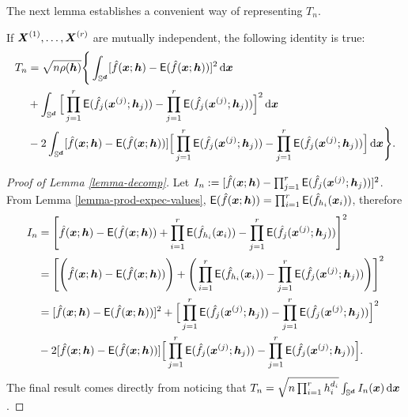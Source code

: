 \documentclass[oneside,11pt]{article}
\begin{document}
The next lemma establishes a convenient way of representing $T_n$.
\begin{lemma}\label{lemma-decomp}
    If $\boldsymbol{X}^{(1)}, \dots, \boldsymbol{X}^{(r)}$ are mutually independent, the following identity is true:
    \begin{align*}
       T_n &= \sqrt{n \rho({\boldsymbol{h}})} \Bigg\{ \int_{\mathbb{S}^{\boldsymbol{d}}} [\hat{f}(\boldsymbol{x};{\boldsymbol{h}}) - \mathsf{E} (\hat{f}(\boldsymbol{x};{\boldsymbol{h}}))]^2 \,\mathrm{d} \boldsymbol{x} \\
    &+ \int_{\mathbb{S}^{\boldsymbol{d}}} \Big[ \prod_{j = 1}^{r} \mathsf{E} (\hat{f}_{j} (\boldsymbol{x}^{(j)};{\boldsymbol{h}}_j)) - \prod_{j = 1}^{r} \mathsf{E} (\hat{f}_{j} (\boldsymbol{x}^{(j)};{\boldsymbol{h}}_j)) \Big]^2 \,\mathrm{d} \boldsymbol{x} \\
    &-2 \int_{\mathbb{S}^{\boldsymbol{d}}} [\hat{f}(\boldsymbol{x};{\boldsymbol{h}}) - \mathsf{E} (\hat{f}(\boldsymbol{x};{\boldsymbol{h}}))] \Big[ \prod_{j = 1}^{r} \mathsf{E} (\hat{f}_{j} (\boldsymbol{x}^{(j)};{\boldsymbol{h}}_j)) - \prod_{j = 1}^{r} \mathsf{E} (\hat{f}_{j} (\boldsymbol{x}^{(j)};{\boldsymbol{h}}_j)) \Big] \,\mathrm{d} \boldsymbol{x} \Bigg\}.
    \end{align*}
\end{lemma}
\begin{proof}[Proof of Lemma \ref{lemma-decomp}]
    Let $I_n := [\hat{f}(\boldsymbol{x};{\boldsymbol{h}}) - \prod_{j = 1}^{r} \mathsf{E} (\hat{f}_{j} (\boldsymbol{x}^{(j)};{\boldsymbol{h}}_j))]^2$. From Lemma \ref{lemma-prod-expec-values}, $\mathsf{E} (\hat{f}(\boldsymbol{x};{\boldsymbol{h}})) = \prod_{i = 1}^{r} \mathsf{E} (\hat{f}_{h_i}(\boldsymbol{x}_i))$, therefore
    \begin{align*}
        I_n &= \Bigg[\hat{f}(\boldsymbol{x};{\boldsymbol{h}}) - \mathsf{E} (\hat{f}(\boldsymbol{x};{\boldsymbol{h}})) + \prod_{i = 1}^{r} \mathsf{E} (\hat{f}_{h_i}(\boldsymbol{x}_i)) - \prod_{j = 1}^{r} \mathsf{E} (\hat{f}_{j} (\boldsymbol{x}^{(j)};{\boldsymbol{h}}_j)) \Bigg]^2 \\
        &= \Bigg[ \Bigg( \hat{f}(\boldsymbol{x};{\boldsymbol{h}}) - \mathsf{E} (\hat{f}(\boldsymbol{x};{\boldsymbol{h}})) \Bigg) + \Bigg( \prod_{i = 1}^{r} \mathsf{E} (\hat{f}_{h_i}(\boldsymbol{x}_i)) - \prod_{j = 1}^{r} \mathsf{E} (\hat{f}_{j} (\boldsymbol{x}^{(j)};{\boldsymbol{h}}_j)) \Bigg) \Bigg]^2 \\
        &= [\hat{f}(\boldsymbol{x};{\boldsymbol{h}}) - \mathsf{E} (\hat{f}(\boldsymbol{x};{\boldsymbol{h}}))]^2 + \Big[ \prod_{j = 1}^{r} \mathsf{E} (\hat{f}_{j} (\boldsymbol{x}^{(j)};{\boldsymbol{h}}_j)) - \prod_{j = 1}^{r} \mathsf{E} (\hat{f}_{j} (\boldsymbol{x}^{(j)};{\boldsymbol{h}}_j)) \Big]^2 \\
        &- 2[\hat{f}(\boldsymbol{x};{\boldsymbol{h}}) - \mathsf{E} (\hat{f}(\boldsymbol{x};{\boldsymbol{h}}))] \Big[ \prod_{j = 1}^{r} \mathsf{E} (\hat{f}_{j} (\boldsymbol{x}^{(j)};{\boldsymbol{h}}_j)) - \prod_{j = 1}^{r} \mathsf{E} (\hat{f}_{j} (\boldsymbol{x}^{(j)};{\boldsymbol{h}}_j)) \Big].
    \end{align*}
    The final result comes directly from noticing that $T_n = \sqrt{n \prod_{i = 1}^{r} h_i^{d_i}} \int_{\mathbb{S}^{\boldsymbol{d}}}I_n(\boldsymbol{x}) \,\mathrm{d} \boldsymbol{x}$.
\end{proof}
\end{document}
